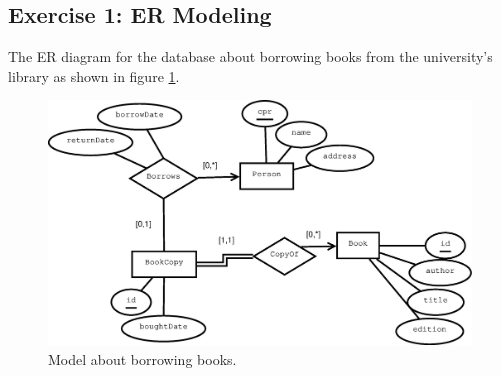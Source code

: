 
\subsection{Exercise 1: ER Modeling}
The ER diagram for the database about borrowing books from the university's library as shown in figure \ref{fig:erdiagram12-03-14}.

\begin{figure}[h]
  \centering
  \includegraphics[width=\linewidth]{3-12.03.14/ERDiagram.eps}
  \caption{Model about borrowing books.}\label{fig:erdiagram12-03-14}
\end{figure}
